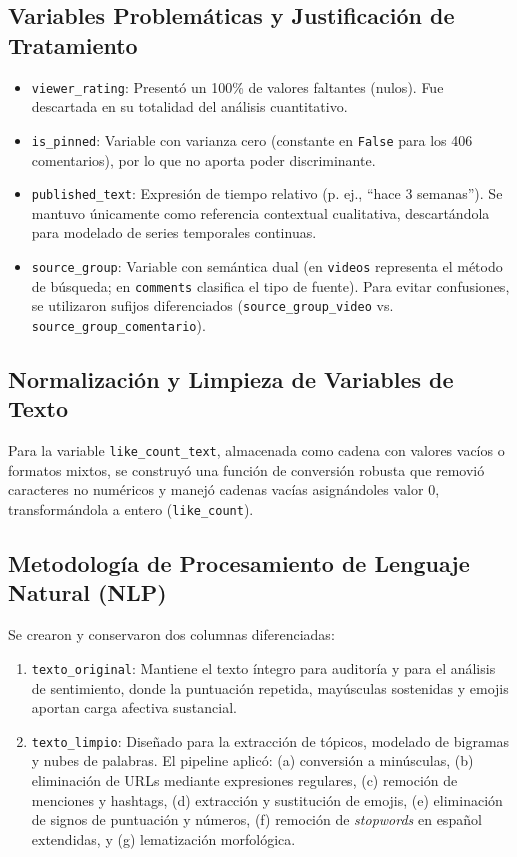 \documentclass[11pt,a4paper]{article}
\begin{document}
\subsection{Variables Problemáticas y Justificación de Tratamiento}
\begin{itemize}
    \item \texttt{viewer\_rating}: Presentó un 100\% de valores faltantes (nulos). Fue descartada en su totalidad del análisis cuantitativo.
    \item \texttt{is\_pinned}: Variable con varianza cero (constante en \texttt{False} para los 406 comentarios), por lo que no aporta poder discriminante.
    \item \texttt{published\_text}: Expresión de tiempo relativo (p. ej., ``hace 3 semanas''). Se mantuvo únicamente como referencia contextual cualitativa, descartándola para modelado de series temporales continuas.
    \item \texttt{source\_group}: Variable con semántica dual (en \texttt{videos} representa el método de búsqueda; en \texttt{comments} clasifica el tipo de fuente). Para evitar confusiones, se utilizaron sufijos diferenciados (\texttt{source\_group\_video} vs. \texttt{source\_group\_comentario}).
\end{itemize}

\subsection{Normalización y Limpieza de Variables de Texto}
Para la variable \texttt{like\_count\_text}, almacenada como cadena con valores vacíos o formatos mixtos, se construyó una función de conversión robusta que removió caracteres no numéricos y manejó cadenas vacías asignándoles valor 0, transformándola a entero (\texttt{like\_count}).

\subsection{Metodología de Procesamiento de Lenguaje Natural (NLP)}
Se crearon y conservaron dos columnas diferenciadas:
\begin{enumerate}
    \item \texttt{texto\_original}: Mantiene el texto íntegro para auditoría y para el análisis de sentimiento, donde la puntuación repetida, mayúsculas sostenidas y emojis aportan carga afectiva sustancial.
    \item \texttt{texto\_limpio}: Diseñado para la extracción de tópicos, modelado de bigramas y nubes de palabras. El pipeline aplicó: (a) conversión a minúsculas, (b) eliminación de URLs mediante expresiones regulares, (c) remoción de menciones y hashtags, (d) extracción y sustitución de emojis, (e) eliminación de signos de puntuación y números, (f) remoción de \textit{stopwords} en español extendidas, y (g) lematización morfológica.
\end{enumerate}
\end{document}
